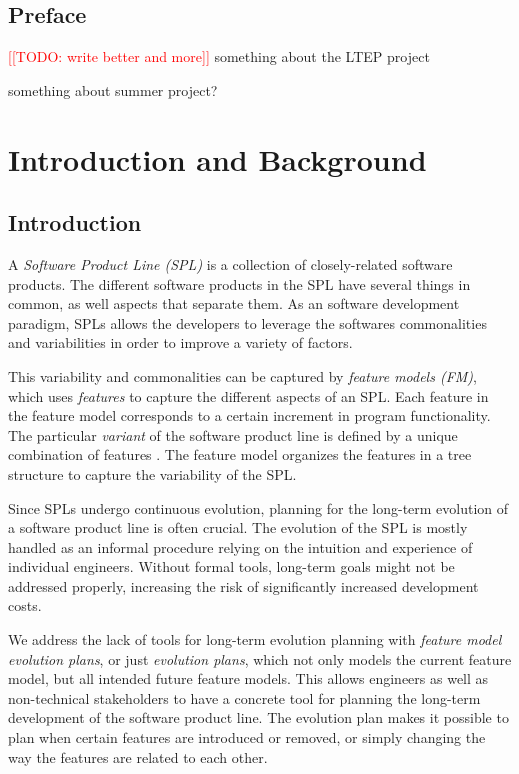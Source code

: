 \documentclass[a4paper,english]{ifimaster}
\newcommand{\todo}[1]{\textcolor{red}{[[TODO: #1]]}\PackageWarning{TODO:}{#1!}}
\begin{document}
\tableofcontents{}
\listoffigures{}
\listoftables{}

\chapter*{Preface}

\todo{write better and more}
something about the LTEP project

something about summer project?

\mainmatter{}

\part{Introduction and Background}%
\label{prt:introduction_and_background}

\chapter{Introduction}%
\label{cha:introduction}

A \textit{Software Product Line (SPL)} is a collection of closely-related software products. The different software products in the SPL have several things in common, as well aspects that separate them. As an software development paradigm, SPLs allows the developers to leverage the softwares commonalities and variabilities in order to improve a variety of factors.

This variability and commonalities can be captured by \textit{feature models (FM)}, which uses \textit{features} to capture the different aspects of an SPL. Each feature in the feature model corresponds to a certain increment in program functionality. The particular \textit{variant} of the software product line is defined by a unique combination of features \cite{cite:don_batory_fm_grammar_prop}. The feature model organizes the features in a tree structure to capture the variability of the SPL.

Since SPLs undergo continuous evolution, planning for the long-term evolution of a software product line is often crucial. The evolution of the SPL is mostly handled as an informal procedure relying on the intuition and experience of individual engineers. Without formal tools, long-term goals might not be addressed properly, increasing the risk of significantly increased development costs.

We address the lack of tools for long-term evolution planning with \textit{feature model evolution plans}, or just \textit{evolution plans}, which not only models the current feature model, but all intended future feature models. This allows engineers as well as non-technical stakeholders to have a concrete tool for planning the long-term development of the software product line. The evolution plan makes it possible to plan when certain features are introduced or removed, or simply changing the way the features are related to each other. 
\end{document}
